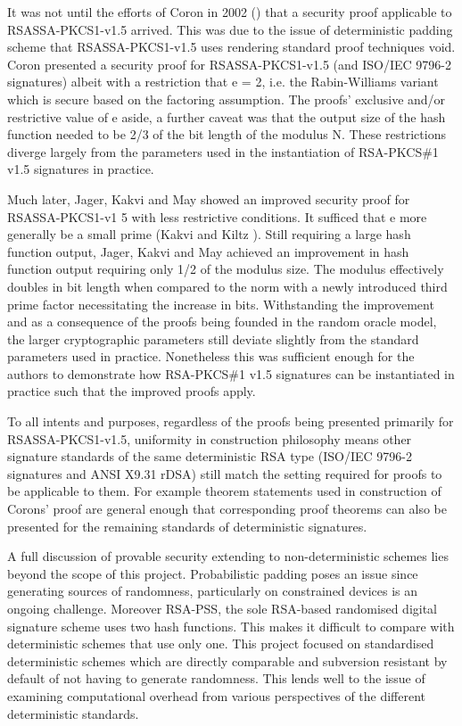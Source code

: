 \documentclass[]{final_report}
\theoremstyle{definition}
\begin{document}
It was not until the efforts of Coron in 2002 (\cite{coron2002security}) that a security proof applicable to RSASSA-PKCS1-v1.5 arrived. This was due to the issue of deterministic padding scheme that RSASSA-PKCS1-v1.5 uses rendering standard proof techniques void. Coron presented a security proof for RSASSA-PKCS1-v1.5 (and ISO/IEC 9796-2 signatures) albeit with a restriction that e = 2, i.e. the Rabin-Williams variant \cite{coron2002security} which is secure based on the factoring assumption. 
The proofs' exclusive and/or restrictive value of e aside, a further caveat was that the output size of the hash function needed to be 2/3 of the bit length of the modulus N. These restrictions diverge largely from the parameters used in the instantiation of RSA-PKCS\#1 v1.5 signatures in practice. 

Much later, Jager, Kakvi and May \cite{jager2018security} showed an improved security proof for RSASSA-PKCS1-v1 5 with less restrictive conditions.
It sufficed that e more generally be a small prime (Kakvi and Kiltz \cite{kakvi2018optimal}). Still requiring a large hash function output, Jager, Kakvi and May achieved an improvement in hash function output requiring only 1/2 of the modulus size. The modulus effectively doubles in bit length when compared to the norm with a newly introduced third prime factor necessitating the increase in bits.
Withstanding the improvement and as a consequence of the proofs being founded in the random oracle model, the larger cryptographic parameters still deviate slightly from the standard parameters used in practice. Nonetheless this was sufficient enough for the authors to demonstrate how RSA-PKCS\#1 v1.5 signatures can be instantiated in practice such that the improved proofs apply. 

To all intents and purposes, regardless of the proofs being presented primarily for RSASSA-PKCS1-v1.5, uniformity in construction philosophy means other signature standards of the same deterministic RSA type (ISO/IEC 9796-2 signatures and ANSI X9.31 rDSA) still match the setting required for proofs to be applicable to them. For example theorem statements used in construction of Corons' proof \cite{coron2002security} are general enough that corresponding proof theorems can also be presented for the remaining standards of deterministic signatures. 

A full discussion of provable security extending to non-deterministic schemes lies beyond the scope of this project. Probabilistic padding poses an issue since generating sources of randomness, particularly on constrained devices is an ongoing challenge. Moreover RSA-PSS, the sole RSA-based randomised digital signature scheme uses two hash functions. This makes it difficult to compare with deterministic schemes that use only one. This project focused on standardised deterministic schemes which are directly comparable and subversion resistant \cite{ateniese2015subversion} by default of not having to generate randomness. This lends well to the issue of examining computational overhead from various perspectives of the different deterministic standards.
\end{document}
